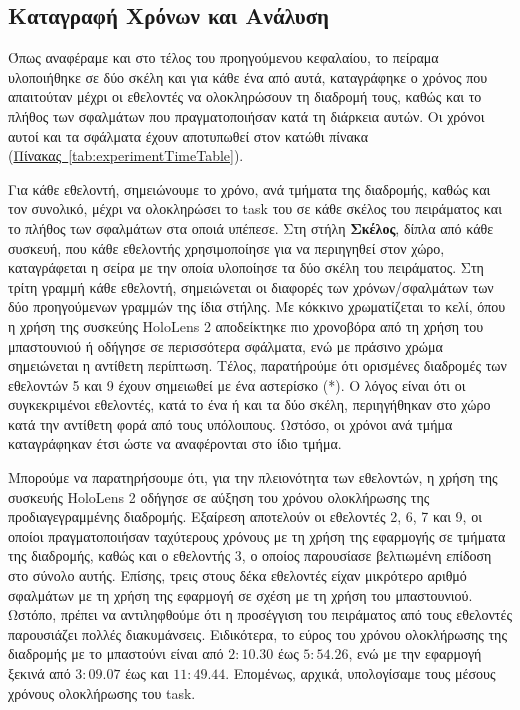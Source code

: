 \subsection{Καταγραφή Χρόνων και Ανάλυση}

Όπως αναφέραμε και στο τέλος του προηγούμενου κεφαλαίου, το πείραμα υλοποιήθηκε σε δύο σκέλη και για κάθε ένα από αυτά, καταγράφηκε ο χρόνος που απαιτούταν μέχρι οι εθελοντές να ολοκληρώσουν τη διαδρομή τους, καθώς και το πλήθος των σφαλμάτων που πραγματοποιήσαν κατά τη διάρκεια αυτών. Οι χρόνοι αυτοί και τα σφάλματα έχουν αποτυπωθεί στον κατώθι πίνακα (\hyperref[tab:experimentTimeTable]{Πίνακας~\ref*{tab:experimentTimeTable}}).



Για κάθε εθελοντή, σημειώνουμε το χρόνο, ανά τμήματα της διαδρομής, καθώς και τον συνολικό, μέχρι να ολοκληρώσει το task του σε κάθε σκέλος του πειράματος και το πλήθος των σφαλμάτων στα οποιά υπέπεσε. Στη στήλη \textbf{Σκέλος}, δίπλα από κάθε συσκευή, που κάθε εθελοντής χρησιμοποίησε για να περιηγηθεί στον χώρο, καταγράφεται η σείρα με την οποία υλοποίησε τα δύο σκέλη του πειράματος. Στη τρίτη γραμμή κάθε εθελοντή, σημειώνεται οι διαφορές των χρόνων/σφαλμάτων των δύο προηγούμενων γραμμών της ίδια στήλης. Με κόκκινο χρωματίζεται το κελί, όπου η χρήση της συσκεύης HoloLens 2 αποδείκτηκε πιο χρονοβόρα από τη χρήση του μπαστουνιού ή οδήγησε σε περισσότερα σφάλματα, ενώ με πράσινο χρώμα σημειώνεται η αντίθετη περίπτωση. Τέλος, παρατήρούμε ότι ορισμένες διαδρομές των εθελοντών 5 και 9 έχουν σημειωθεί με ένα αστερίσκο (*). Ο λόγος είναι ότι οι συγκεκριμένοι εθελοντές, κατά το ένα ή και τα δύο σκέλη, περιηγήθηκαν στο χώρο κατά την αντίθετη φορά από τους υπόλοιπους. Ωστόσο, οι χρόνοι ανά τμήμα καταγράφηκαν έτσι ώστε να αναφέρονται στο ίδιο τμήμα.

Μπορούμε να παρατηρήσουμε ότι, για την πλειονότητα των εθελοντών, η χρήση της συσκευής HoloLens 2 οδήγησε σε αύξηση του χρόνου ολοκλήρωσης της προδιαγεγραμμένης διαδρομής. Εξαίρεση αποτελούν οι εθελοντές 2, 6, 7 και 9, οι οποίοι πραγματοποιήσαν ταχύτερους χρόνους με τη χρήση της εφαρμογής σε τμήματα της διαδρομής, καθώς και ο εθελοντής 3, ο οποίος παρουσίασε βελτιωμένη επίδοση στο σύνολο αυτής. Επίσης, τρεις στους δέκα εθελοντές είχαν μικρότερο αριθμό σφαλμάτων με τη χρήση της εφαρμογή σε σχέση με τη χρήση του μπαστουνιού. Ωστόπο, πρέπει να αντιληφθούμε ότι η προσέγγιση του πειράματος από τους εθελοντές παρουσιάζει πολλές διακυμάνσεις. Ειδικότερα, το εύρος του χρόνου ολοκλήρωσης της διαδρομής με το μπαστούνι είναι από $2:10.30$ έως $5:54.26$, ενώ με την εφαρμογή ξεκινά από $3:09.07$ έως και $11:49.44$. Επομένως, αρχικά, υπολογίσαμε τους μέσους χρόνους ολοκλήρωσης του task.

